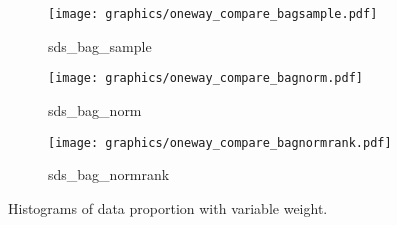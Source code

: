 \begin{figure}[H]
\begin{subfigure}{0.32\textwidth}
        \centering
        \texttt{[image: graphics/oneway\_compare\_bagsample.pdf]}  
        \caption{sds\_bag\_sample}
        \label{subfig:bagsample}
    \end{subfigure}
    \begin{subfigure}{0.32\textwidth}
        \centering
        \texttt{[image: graphics/oneway\_compare\_bagnorm.pdf]}  
        \caption{sds\_bag\_norm}
        \label{subfig:bagnorm}
    \end{subfigure}
    \begin{subfigure}{0.32\textwidth}
        \centering
        \texttt{[image: graphics/oneway\_compare\_bagnormrank.pdf]}  
        \caption{sds\_bag\_normrank}
        \label{subfig:bagnormrank}
    \end{subfigure}
\caption{Histograms of data proportion with variable weight.}
\label{fig:weight-1}
\end{figure}

